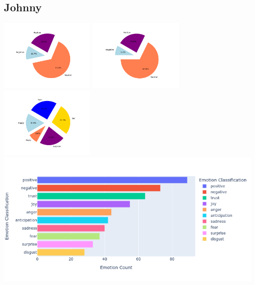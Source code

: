 \documentclass[a4paper,12pt]{article}
\begin{document}
	\subsection{Johnny}
	{\includegraphics[height=3.5cm]{johnnysVaderEmotionalPie.png}}
	{\includegraphics[height=3.5cm]{johnnysBlobEmotionalPie.png}}
	{\includegraphics[height=3.5cm]{johnnysEmotionalPie.png}}\\
	{\includegraphics[width=17cm]{johnnyNrcImage.png}}\\
	\clearpage
\end{document}
